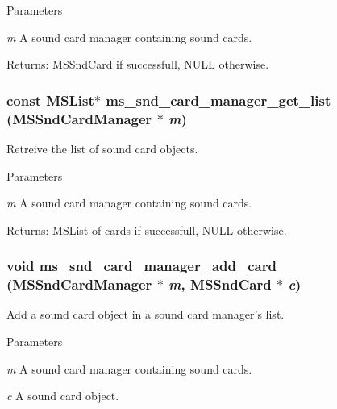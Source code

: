\begin{DoxyParams}{Parameters}
\item[{\em m}]A sound card manager containing sound cards.\end{DoxyParams}
Returns: MSSndCard if successfull, NULL otherwise. 
\subsubsection[{ms\_\-snd\_\-card\_\-manager\_\-get\_\-list}]{\setlength{\rightskip}{0pt plus 5cm}const MSList$\ast$ ms\_\-snd\_\-card\_\-manager\_\-get\_\-list ({\bf MSSndCardManager} $\ast$ {\em m})}\label{group__mediastreamer2__soundcardmanager_ga8cbccf9957b2aa1a384a82a5ba7f6136}
Retreive the list of sound card objects.


\begin{DoxyParams}{Parameters}
\item[{\em m}]A sound card manager containing sound cards.\end{DoxyParams}
Returns: MSList of cards if successfull, NULL otherwise. 
\subsubsection[{ms\_\-snd\_\-card\_\-manager\_\-add\_\-card}]{\setlength{\rightskip}{0pt plus 5cm}void ms\_\-snd\_\-card\_\-manager\_\-add\_\-card ({\bf MSSndCardManager} $\ast$ {\em m}, \/  {\bf MSSndCard} $\ast$ {\em c})}\label{group__mediastreamer2__soundcardmanager_ga413e7eca0a776dfd4074247f95ccb9b3}
Add a sound card object in a sound card manager's list.


\begin{DoxyParams}{Parameters}
\item[{\em m}]A sound card manager containing sound cards. \item[{\em c}]A sound card object. \end{DoxyParams}
